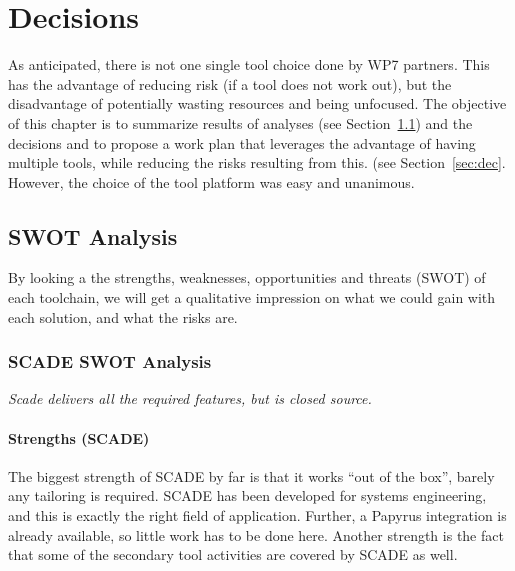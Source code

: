 

\newcommand{\decision}[2]{
\begin{center}
\begin{tabular}{ p{13cm} }
\refstepcounter{decision}\label{#2}\textbf{Decision~\arabic{decision}}  \\
\hline
\multicolumn{1}{|p{13cm}|}{#1} \\
\hline
\end{tabular}
\end{center}
}



\chapter{Decisions}
\label{sec:decision}

As anticipated, there is not one single tool choice done by WP7 partners. This has the advantage of reducing risk (if a tool does not work out), but the disadvantage of potentially wasting resources and being unfocused.  The objective of this chapter is to summarize results of analyses (see Section~\ref{sec:swot}) and the decisions and to propose a work plan that leverages the advantage of having multiple tools, while reducing the risks resulting from this. (see Section~\ref{sec:dec}.  However, the choice of the tool platform was easy and unanimous.

\section{SWOT Analysis}
\label{sec:swot}

By looking a the strengths, weaknesses, opportunities and threats (SWOT) of each toolchain, we will get a qualitative impression on what we could gain with each solution, and what the risks are.

\subsection{SCADE SWOT Analysis}

\emph{Scade delivers all the required features, but is closed source.}

\subsubsection{Strengths (SCADE)}

The biggest strength of SCADE by far is that it works ``out of the box'', barely any tailoring is required.  SCADE has been developed for systems engineering, and this is exactly the right field of application.  Further, a Papyrus integration is already available, so little work has to be done here.  Another strength is the fact that some of the secondary tool activities are covered by SCADE as well.

